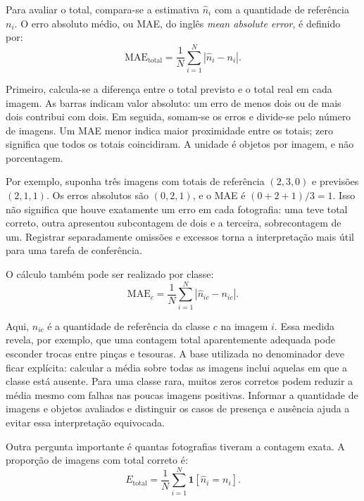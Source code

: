 Para avaliar o total, compara-se a estimativa $\widehat{n}_i$ com a quantidade de referência $n_i$. O erro absoluto médio, ou MAE, do inglês \textit{mean absolute error}, é definido por:
\begin{equation}
\mathrm{MAE}_{\mathrm{total}}=\frac{1}{N}\sum_{i=1}^{N}|\widehat{n}_i-n_i|.
\label{eq:fund_mae}
\end{equation}

Primeiro, calcula-se a diferença entre o total previsto e o total real em cada imagem. As barras indicam valor absoluto: um erro de menos dois ou de mais dois contribui com dois. Em seguida, somam-se os erros e divide-se pelo número de imagens. Um MAE menor indica maior proximidade entre os totais; zero significa que todos os totais coincidiram. A unidade é objetos por imagem, e não porcentagem.

Por exemplo, suponha três imagens com totais de referência $(2,3,0)$ e previsões $(2,1,1)$. Os erros absolutos são $(0,2,1)$, e o MAE é $(0+2+1)/3=1$. Isso não significa que houve exatamente um erro em cada fotografia: uma teve total correto, outra apresentou subcontagem de dois e a terceira, sobrecontagem de um. Registrar separadamente omissões e excessos torna a interpretação mais útil para uma tarefa de conferência.

O cálculo também pode ser realizado por classe:
\begin{equation}
\mathrm{MAE}_{c}=\frac{1}{N}\sum_{i=1}^{N}|\widehat{n}_{ic}-n_{ic}|.
\label{eq:fund_mae_classe}
\end{equation}

Aqui, $n_{ic}$ é a quantidade de referência da classe $c$ na imagem $i$. Essa medida revela, por exemplo, que uma contagem total aparentemente adequada pode esconder trocas entre pinças e tesouras. A base utilizada no denominador deve ficar explícita: calcular a média sobre todas as imagens inclui aquelas em que a classe está ausente. Para uma classe rara, muitos zeros corretos podem reduzir a média mesmo com falhas nas poucas imagens positivas. Informar a quantidade de imagens e objetos avaliados e distinguir os casos de presença e ausência ajuda a evitar essa interpretação equivocada.

Outra pergunta importante é quantas fotografias tiveram a contagem exata. A proporção de imagens com total correto é:
\begin{equation}
E_{\mathrm{total}}=\frac{1}{N}\sum_{i=1}^{N}\mathbf{1}[\widehat{n}_i=n_i].
\label{eq:fund_exato_total}
\end{equation}

